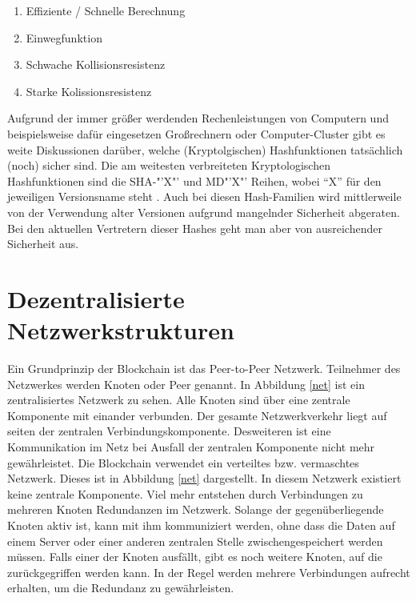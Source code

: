 \begin{enumerate}
\item{Effiziente / Schnelle Berechnung}
\item{Einwegfunktion}
\item{Schwache Kollisionsresistenz}
\item{Starke Kolissionsresistenz}
\end{enumerate}
		
		Aufgrund der immer größer werdenden Rechenleistungen von Computern und beispielsweise dafür eingesetzen Großrechnern oder Computer-Cluster gibt es weite Diskussionen darüber, welche (Kryptolgischen) Hashfunktionen tatsächlich (noch) sicher sind. Die am weitesten verbreiteten Kryptologischen Hashfunktionen sind die SHA-"'X"' und MD"'X"' Reihen, wobei "`X"' für den jeweiligen Versionsname steht \citep{shamd}. Auch bei diesen Hash-Familien wird mittlerweile von der Verwendung alter Versionen aufgrund mangelnder Sicherheit abgeraten. Bei den aktuellen Vertretern dieser Hashes geht man aber von ausreichender Sicherheit aus.
		
	\section{\label{subsec:p2p}Dezentralisierte Netzwerkstrukturen}
	
Ein Grundprinzip der Blockchain ist das Peer-to-Peer Netzwerk. Teilnehmer des Netzwerkes werden Knoten oder Peer genannt. In Abbildung \ref{net} ist ein zentralisiertes Netzwerk zu sehen. Alle Knoten sind über eine zentrale Komponente mit einander verbunden. Der gesamte Netzwerkverkehr liegt auf seiten der zentralen Verbindungskomponente. Desweiteren ist eine Kommunikation im Netz bei Ausfall der zentralen Komponente nicht mehr gewährleistet. 
Die Blockchain verwendet ein verteiltes bzw. vermaschtes Netzwerk. Dieses ist in Abbildung \ref{net} dargestellt. In diesem Netzwerk existiert keine zentrale Komponente. Viel mehr entstehen durch Verbindungen zu mehreren Knoten Redundanzen im Netzwerk. Solange der gegenüberliegende Knoten aktiv ist, kann mit ihm kommuniziert werden, ohne dass die Daten auf einem Server oder einer anderen zentralen Stelle zwischengespeichert werden müssen. Falls einer der Knoten ausfällt, gibt es noch weitere Knoten, auf die zurückgegriffen werden kann. In der Regel werden mehrere Verbindungen aufrecht erhalten, um die Redundanz zu gewährleisten. 

